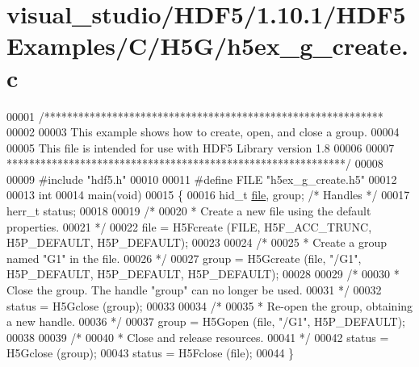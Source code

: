 \hypertarget{visual__studio_2_h_d_f5_21_810_81_2_h_d_f5_examples_2_c_2_h5_g_2h5ex__g__create_8c_source}{}\section{visual\+\_\+studio/\+H\+D\+F5/1.10.1/\+H\+D\+F5\+Examples/\+C/\+H5\+G/h5ex\+\_\+g\+\_\+create.c}
\label{visual__studio_2_h_d_f5_21_810_81_2_h_d_f5_examples_2_c_2_h5_g_2h5ex__g__create_8c_source}

\begin{DoxyCode}
00001 \textcolor{comment}{/************************************************************}
00002 \textcolor{comment}{}
00003 \textcolor{comment}{  This example shows how to create, open, and close a group.}
00004 \textcolor{comment}{}
00005 \textcolor{comment}{  This file is intended for use with HDF5 Library version 1.8}
00006 \textcolor{comment}{}
00007 \textcolor{comment}{ ************************************************************/}
00008 
00009 \textcolor{preprocessor}{#include "hdf5.h"}
00010 
00011 \textcolor{preprocessor}{#define FILE "h5ex\_g\_create.h5"}
00012 
00013 \textcolor{keywordtype}{int}
00014 main(\textcolor{keywordtype}{void})
00015 \{
00016     hid\_t       \hyperlink{structfile}{file}, group;         \textcolor{comment}{/* Handles */}
00017     herr\_t      status;
00018 
00019     \textcolor{comment}{/*}
00020 \textcolor{comment}{     * Create a new file using the default properties.}
00021 \textcolor{comment}{     */}
00022     file = H5Fcreate (FILE, H5F\_ACC\_TRUNC, H5P\_DEFAULT, H5P\_DEFAULT);
00023 
00024     \textcolor{comment}{/*}
00025 \textcolor{comment}{     * Create a group named "G1" in the file.}
00026 \textcolor{comment}{     */}
00027     group = H5Gcreate (file, \textcolor{stringliteral}{"/G1"}, H5P\_DEFAULT, H5P\_DEFAULT, H5P\_DEFAULT);
00028 
00029     \textcolor{comment}{/*}
00030 \textcolor{comment}{     * Close the group.  The handle "group" can no longer be used.}
00031 \textcolor{comment}{     */}
00032     status = H5Gclose (group);
00033 
00034     \textcolor{comment}{/*}
00035 \textcolor{comment}{     * Re-open the group, obtaining a new handle.}
00036 \textcolor{comment}{     */}
00037     group = H5Gopen (file, \textcolor{stringliteral}{"/G1"}, H5P\_DEFAULT);
00038 
00039     \textcolor{comment}{/*}
00040 \textcolor{comment}{     * Close and release resources.}
00041 \textcolor{comment}{     */}
00042     status = H5Gclose (group);
00043     status = H5Fclose (file);
00044 \}
\end{DoxyCode}
